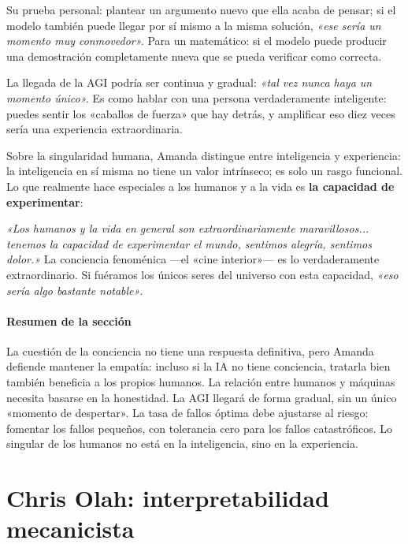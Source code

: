 Su prueba personal: plantear un argumento nuevo que ella acaba de pensar; si el modelo también puede llegar por sí mismo a la misma solución, \textit{«ese sería un momento muy conmovedor».} Para un matemático: si el modelo puede producir una demostración completamente nueva que se pueda verificar como correcta.

La llegada de la AGI podría ser continua y gradual: \textit{«tal vez nunca haya un momento único».} Es como hablar con una persona verdaderamente inteligente: puedes sentir los «caballos de fuerza» que hay detrás, y amplificar eso diez veces sería una experiencia extraordinaria.

Sobre la singularidad humana, Amanda distingue entre inteligencia y experiencia: la inteligencia en sí misma no tiene un valor intrínseco; es solo un rasgo funcional. Lo que realmente hace especiales a los humanos y a la vida es \textbf{la capacidad de experimentar}:

\textit{«Los humanos y la vida en general son extraordinariamente maravillosos... tenemos la capacidad de experimentar el mundo, sentimos alegría, sentimos dolor.»} La conciencia fenoménica —el «cine interior»— es lo verdaderamente extraordinario. Si fuéramos los únicos seres del universo con esta capacidad, \textit{«eso sería algo bastante notable»}.

\subsection{Resumen de la sección}

La cuestión de la conciencia no tiene una respuesta definitiva, pero Amanda defiende mantener la empatía: incluso si la IA no tiene conciencia, tratarla bien también beneficia a los propios humanos. La relación entre humanos y máquinas necesita basarse en la honestidad. La AGI llegará de forma gradual, sin un único «momento de despertar». La tasa de fallos óptima debe ajustarse al riesgo: fomentar los fallos pequeños, con tolerancia cero para los fallos catastróficos. Lo singular de los humanos no está en la inteligencia, sino en la experiencia.

\part{Chris Olah: interpretabilidad mecanicista}

